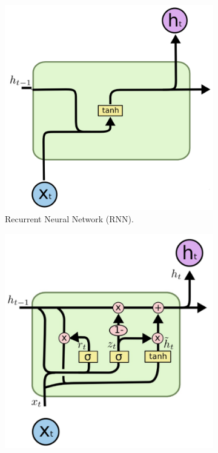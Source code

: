 \begin{figure}[h]
    \centering
    \begin{subfigure}[t]{0.3\textwidth}
      \includegraphics[width=\linewidth]{imgs/models/rnn-2.png}
      \caption{Recurrent Neural Network (RNN).} \label{fig:rnn}
    \end{subfigure}%
    \hspace{1em}%
    \begin{subfigure}[t]{0.3\textwidth}
        \includegraphics[width=\linewidth]{imgs/models/gru-2.png}

\end{subfigure}
\end{figure}
